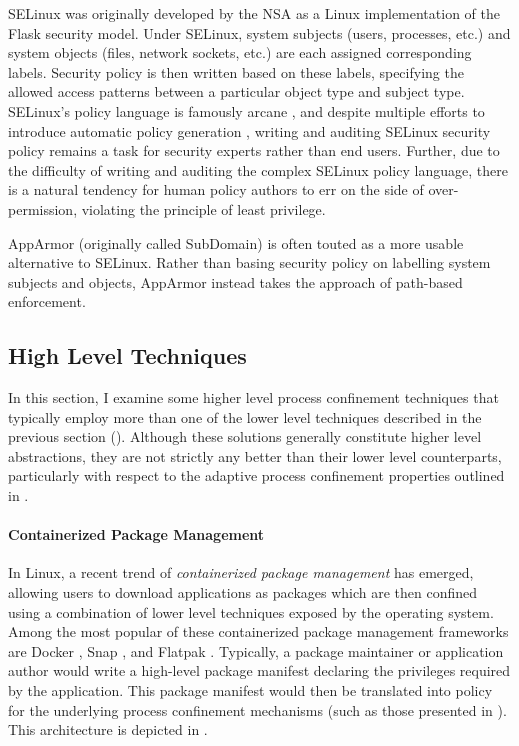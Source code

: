\documentclass[dvipsnames, 12pt]{article}
\begin{document}
SELinux \cite{smalley2001_selinux} was originally developed by the NSA as
a Linux implementation of the Flask \cite{spencer1999_flask} security model.
Under SELinux, system subjects (users, processes, etc.) and system objects
(files, network sockets, etc.) are each assigned corresponding labels. Security
policy is then written based on these labels, specifying the allowed access
patterns between a particular object type and subject type. SELinux's policy
language is famously arcane \cite{schreuders12_towards}, and despite multiple
efforts to introduce automatic policy generation \cite{audit2allow,
macmillan07_madison, macmillan07_madison}, writing and auditing SELinux security
policy remains a task for security experts rather than end users. Further, due
to the difficulty of writing and auditing the complex SELinux policy language,
there is a natural tendency for human policy authors to err on the side of
over-permission, violating the principle of least privilege.

AppArmor (originally called SubDomain) \cite{cowan2000_apparmor} is often touted
as a more usable alternative to SELinux. Rather than basing security policy on
labelling system subjects and objects, AppArmor instead takes the approach of
path-based enforcement.


\subsection{High Level Techniques}
\label{sec:high-level}

In this section, I examine some higher level process confinement techniques that
typically employ more than one of the lower level techniques described in the
previous section (). Although these solutions generally
constitute higher level abstractions, they are not strictly any better than
their lower level counterparts, particularly with respect to the adaptive
process confinement properties outlined in .

\paragraph*{Containerized Package Management}
In Linux, a recent trend of \textit{containerized package management} has
emerged, allowing users to download applications as packages which are then
confined using a combination of lower level techniques exposed by the operating
system. Among the most popular of these containerized package management
frameworks are Docker \cite{docker}, Snap \cite{snap}, and Flatpak
\cite{flatpak}. Typically, a package maintainer or application author would
write a high-level package manifest declaring the privileges required by the
application. This package manifest would then be translated into policy for the
underlying process confinement mechanisms (such as those presented in
). This architecture is depicted in
.
\end{document}
